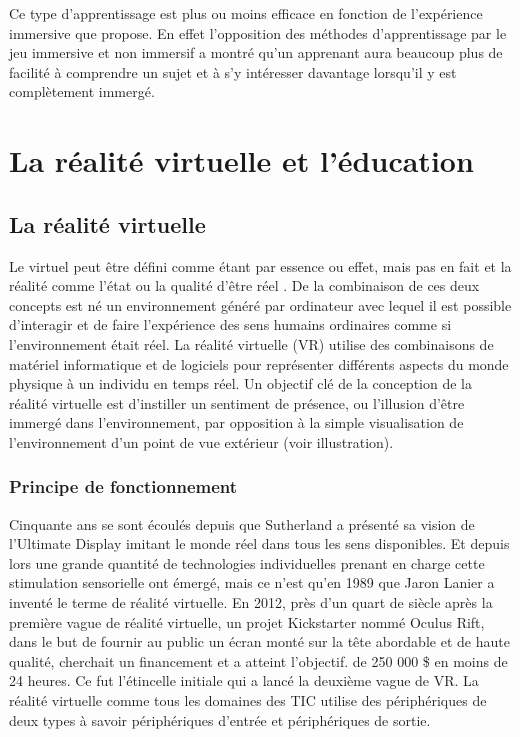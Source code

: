 Ce type d'apprentissage est plus ou moins efficace en fonction de l'expérience immersive que propose. En effet l'opposition des méthodes d'apprentissage par le jeu immersive et non immersif a montré qu'un apprenant aura beaucoup plus de facilité à comprendre un sujet et à s'y intéresser davantage lorsqu'il y est complètement immergé\cite{de2017motivational,Shackelford2019RelationshipsBC,Abdelaziz2020TheIO}.

\section{La réalité virtuelle et l'éducation}
\subsection{La réalité virtuelle}

Le virtuel peut être défini comme \og étant par essence ou effet, mais pas en fait \fg\cite{Jerald2015WhatIV} et la réalité comme \og l'état ou la qualité d'être réel \fg\cite{Jerald2015WhatIV}. 
De la combinaison de ces deux concepts est né un environnement généré par ordinateur avec lequel il est possible d'interagir et de faire l'expérience des sens humains ordinaires comme si l'environnement était réel\cite{Rheingold1991VirtualR}. 
La réalité virtuelle (VR) utilise des combinaisons de matériel informatique et de logiciels pour représenter différents aspects du monde physique à un individu en temps réel. 
Un objectif clé de la conception de la réalité virtuelle est d'instiller un sentiment de présence, ou l'illusion d'être immergé dans l'environnement, par opposition à la simple visualisation de l'environnement d'un point de vue extérieur (voir illustration).

\subsubsection{Principe de fonctionnement}

Cinquante ans se sont écoulés depuis que Sutherland a présenté sa vision de l'Ultimate Display\cite{sutherland1965ultimate} imitant le monde réel dans tous les sens disponibles.
Et depuis lors une grande quantité de technologies individuelles prenant en charge cette stimulation sensorielle ont émergé, mais ce n'est qu'en 1989 que Jaron Lanier a inventé le terme de réalité virtuelle\cite{Rheingold1991VirtualR}.
En 2012, près d'un quart de siècle après la première vague de réalité virtuelle, un projet Kickstarter nommé Oculus Rift, dans le but de fournir au public un écran monté sur la tête abordable et de haute qualité, cherchait un financement et a atteint l'objectif. de 250 000 \$ en moins de 24 heures. Ce fut l'étincelle initiale qui a lancé la deuxième vague de VR\cite{anthes2016state}.
La réalité virtuelle comme tous les domaines des TIC utilise des périphériques de deux types à savoir périphériques d'entrée et périphériques de sortie.


